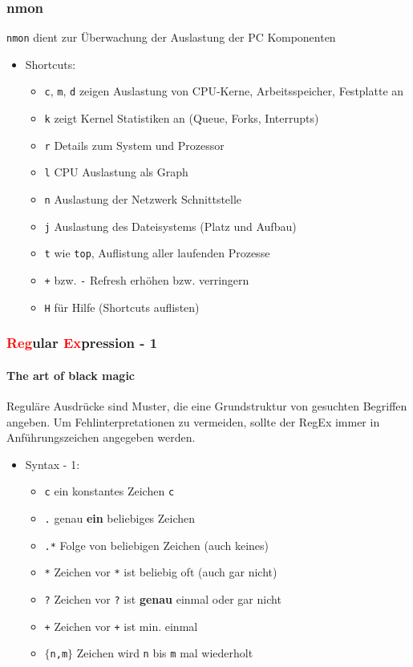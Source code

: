 \documentclass[12pt,utf8, handout]{beamer}
\begin{document}
\begin{frame}
\frametitle{nmon}
\texttt{nmon} dient zur Überwachung der Auslastung der PC Komponenten
\begin{itemize}
	\item Shortcuts:
	\begin{itemize}[<+->]
		\item {\scriptsize \texttt{c}, \texttt{m}, \texttt{d} zeigen Auslastung von CPU-Kerne, Arbeitsspeicher, Festplatte an}
		\item {\scriptsize \texttt{k} zeigt Kernel Statistiken an (Queue, Forks, Interrupts)}
		\item {\scriptsize \texttt{r} Details zum System und Prozessor}
		\item {\scriptsize \texttt{l} CPU Auslastung als Graph}
		\item {\scriptsize \texttt{n} Auslastung der Netzwerk Schnittstelle}
		\item {\scriptsize \texttt{j} Auslastung des Dateisystems (Platz und Aufbau)}
		\item {\scriptsize \texttt{t} wie \texttt{top}, Auflistung aller laufenden Prozesse}
		\item {\scriptsize \texttt{+} bzw. \texttt{-} Refresh erhöhen bzw. verringern}
		\item {\scriptsize \texttt{H} für Hilfe (Shortcuts auflisten)}
	\end{itemize}
\end{itemize}
\end{frame}

\begin{frame}
\frametitle{\textcolor{red}{Reg}ular \textcolor{red}{Ex}pression - 1}
\framesubtitle{\textcolor{ownDarkOr}{The art of black magic}}
Reguläre Ausdrücke sind Muster, die eine Grundstruktur von gesuchten Begriffen angeben. Um Fehlinterpretationen zu vermeiden, sollte der RegEx immer in Anführungszeichen angegeben werden.
\begin{itemize}
	\item Syntax - 1:
	\begin{itemize}[<+->]
		\item {\scriptsize \texttt{c} ein konstantes Zeichen \texttt{c}}
		\item {\scriptsize \texttt{.} genau \textbf{ein} beliebiges Zeichen}
		\item {\scriptsize \texttt{.*} Folge von beliebigen Zeichen (auch keines)}
		\item {\scriptsize \texttt{*} Zeichen vor \texttt{*} ist beliebig oft (auch gar nicht)}
		\item {\scriptsize \texttt{?} Zeichen vor \texttt{?} ist \textbf{genau} einmal oder gar nicht}
		\item {\scriptsize \texttt{+} Zeichen vor \texttt{+} ist min. einmal}
		\item {\scriptsize \texttt{$\{$n,m$\}$} Zeichen wird \texttt{n} bis \texttt{m} mal wiederholt}
	\end{itemize}
\end{itemize}
\end{frame}
\end{document}
